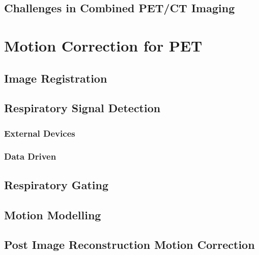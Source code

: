         \subsection{Challenges in Combined PET/CT Imaging} \label{challenges_in_combined_pet_ct_imaging}
            \blindtext
    
    \section{Motion Correction for PET} \label{motion_correction_for_pet}
        \blindtext
    
        \subsection{Image Registration} \label{image_registration}
            \blindtext
            
        \subsection{Respiratory Signal Detection} \label{respiratory_signal_detection}
            \blindtext
            
            \subsubsection{External Devices} \label{external_devices}
                \blindtext
                
            \subsubsection{Data Driven} \label{data_driven}
                \blindtext
                
        \subsection{Respiratory Gating} \label{respiratory_gating}
            \blindtext
            
        \subsection{Motion Modelling} \label{motion_modelling}
            \blindtext
        
        \subsection{Post Image Reconstruction Motion Correction} \label{respiratory_motion_artefacts}
            \blindtext
            
